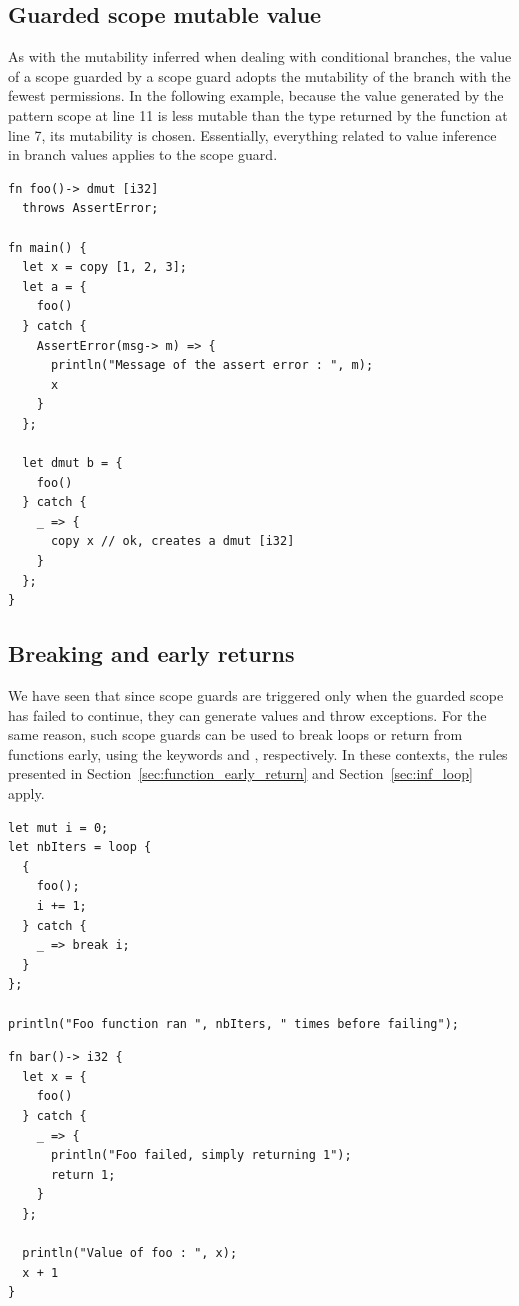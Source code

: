 \subsection{Guarded scope mutable value}

As with the mutability inferred when dealing with conditional branches, the
value of a scope guarded by a  scope guard adopts the mutability of
the branch with the fewest permissions. In the following example, because the
value generated by the  pattern scope at line 11 is less mutable
than the type returned by the function  at line 7, its mutability is
chosen. Essentially, everything related to value inference in branch values
applies to the  scope guard.

\begin{lstlisting}[style=coloredverbatim]
fn foo()-> dmut [i32]
  throws AssertError;

fn main() {
  let x = copy [1, 2, 3];
  let a = {
    foo()
  } catch {
    AssertError(msg-> m) => {
      println("Message of the assert error : ", m);
      x
    }
  };

  let dmut b = {
    foo()
  } catch {
    _ => {
      copy x // ok, creates a dmut [i32]
    }
  };
}
\end{lstlisting}

\subsection{Breaking and early returns}

We have seen that since  scope guards are triggered only when the
guarded scope has failed to continue, they can generate values and throw
exceptions. For the same reason, such scope guards can be used to break loops or
return from functions early, using the keywords  and
, respectively. In these contexts, the rules presented in
Section~\ref{sec:function_early_return} and Section~\ref{sec:inf_loop} apply.

\begin{lstlisting}[style=coloredverbatim]
let mut i = 0;
let nbIters = loop {
  {
    foo();
    i += 1;
  } catch {
    _ => break i;
  }
};

println("Foo function ran ", nbIters, " times before failing");
\end{lstlisting}

\begin{lstlisting}[style=coloredverbatim]
fn bar()-> i32 {
  let x = {
    foo()
  } catch {
    _ => {
      println("Foo failed, simply returning 1");
      return 1;
    }
  };

  println("Value of foo : ", x);
  x + 1
}
\end{lstlisting}

